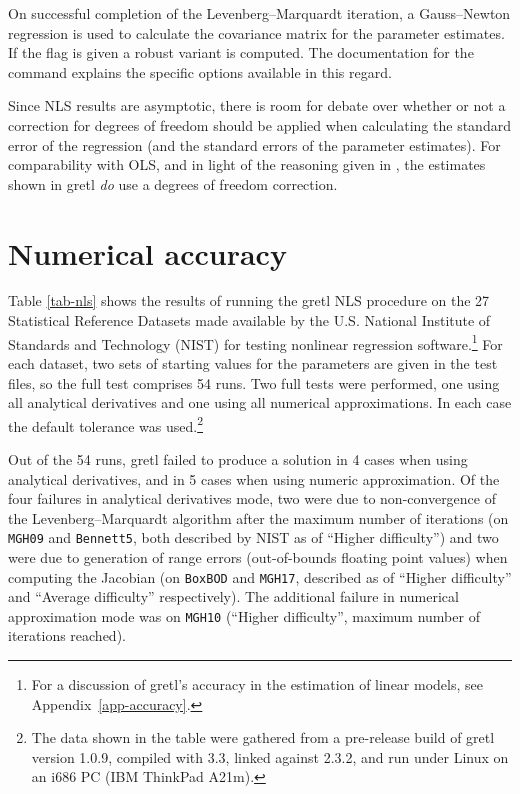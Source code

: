 On successful completion of the Levenberg--Marquardt iteration, a
Gauss--Newton regression is used to calculate the covariance matrix
for the parameter estimates.  If the  flag is given a
robust variant is computed.  The documentation for the 
command explains the specific options available in this regard.

Since NLS results are asymptotic, there is room for debate over
whether or not a correction for degrees of freedom should be applied
when calculating the standard error of the regression (and the
standard errors of the parameter estimates).  For comparability with
OLS, and in light of the reasoning given in
\cite{davidson-mackinnon93}, the estimates shown in gretl
\emph{do} use a degrees of freedom correction.

\section{Numerical accuracy}
\label{nls-accuracy}

Table \ref{tab-nls} shows the results of running the gretl NLS
procedure on the 27 Statistical Reference Datasets made available by
the U.S.  National Institute of Standards and Technology (NIST) for
testing nonlinear regression software.\footnote{For a discussion of
  gretl's accuracy in the estimation of linear models, see
  Appendix~\ref{app-accuracy}.}  For each dataset, two sets of
starting values for the parameters are given in the test files, so the
full test comprises 54 runs.  Two full tests were performed, one using
all analytical derivatives and one using all numerical approximations.
In each case the default tolerance was used.\footnote{The data shown
  in the table were gathered from a pre-release build of gretl
  version 1.0.9, compiled with  3.3, linked against
   2.3.2, and run under Linux on an i686 PC (IBM ThinkPad
  A21m).}

Out of the 54 runs, gretl failed to produce a solution
in 4 cases when using analytical derivatives, and in 5 cases when
using numeric approximation. Of the four failures in analytical
derivatives mode, two were due to non-convergence of the
Levenberg--Marquardt algorithm after the maximum number of iterations
(on \verb+MGH09+ and \verb+Bennett5+, both described by NIST as of
``Higher difficulty'') and two were due to generation of range errors
(out-of-bounds floating point values) when computing the Jacobian (on
\verb+BoxBOD+ and \verb+MGH17+, described as of ``Higher difficulty''
and ``Average difficulty'' respectively).  The additional failure in
numerical approximation mode was on \verb+MGH10+ (``Higher
difficulty'', maximum number of iterations reached).

